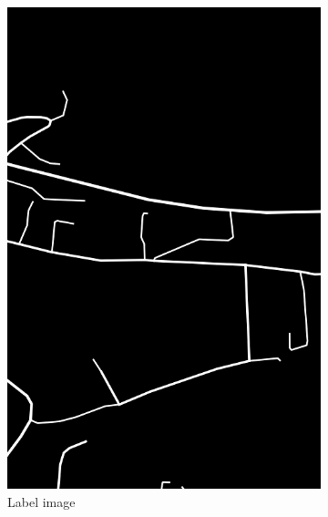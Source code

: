 \begin{figure}
\begin{subfigure}{0.32\textwidth}
\includegraphics[width=\linewidth]{figs/datasets/Norwegian_roads_label_example2.png}
\caption{Label image} \label{fig:norwegian_roads_example_label}
\end{subfigure}
\hspace*{\fill} %
\begin{subfigure}{0.32\textwidth}

\end{subfigure}
\end{figure}
